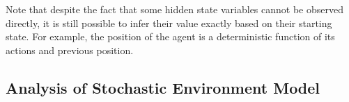 Note that despite the fact that some hidden state variables cannot be observed directly, it is still possible to infer their value exactly based on their starting state. For example, the position of the agent is a deterministic function of its actions and previous position. %


\subsection{Analysis of Stochastic Environment Model}
